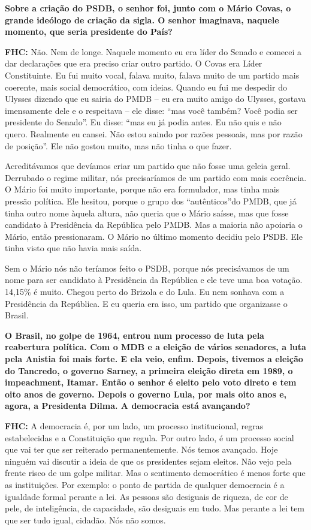 \textbf{Sobre a criação do PSDB, o senhor foi, junto com o Mário Covas,
o grande ideólogo de criação da sigla. O senhor imaginava, naquele
momento, que seria presidente do País?}

\textbf{FHC:} Não. Nem de longe. Naquele momento eu era líder do Senado
e comecei a dar declarações que era preciso criar outro partido. O Covas
era Líder Constituinte. Eu fui muito vocal, falava muito, falava muito
de um partido mais coerente, mais social democrático, com ideias. Quando
eu fui me despedir do Ulysses dizendo que eu sairia do PMDB -- eu era
muito amigo do Ulysses, gostava imensamente dele e o respeitava -- ele
disse: ``mas você também? Você podia ser presidente do Senado''. Eu
disse: ``mas eu já podia antes. Eu não quis e não quero. Realmente eu
cansei. Não estou saindo por razões pessoais, mas por razão de
posição''. Ele não gostou muito, mas não tinha o que fazer.

Acreditávamos que devíamos criar um partido que não fosse uma geleia
geral. Derrubado o regime militar, nós precisaríamos de um partido com
mais coerência. O Mário foi muito importante, porque não era formulador,
mas tinha mais pressão política. Ele hesitou, porque o grupo dos
``autênticos''do PMDB, que já tinha outro nome àquela altura, não queria
que o Mário saísse, mas que fosse candidato à Presidência da República
pelo PMDB. Mas a maioria não apoiaria o Mário, então pressionaram. O
Mário no último momento decidiu pelo PSDB. Ele tinha visto que não havia
mais saída.

Sem o Mário nós não teríamos feito o PSDB, porque nós precisávamos de um
nome para ser candidato à Presidência da República e ele teve uma boa
votação. 14,15\% é muito. Chegou perto do Brizola e do Lula. Eu nem
sonhava com a Presidência da República. E eu queria era isso, um partido
que organizasse o Brasil.

\textbf{O Brasil, no golpe de 1964, entrou num processo de luta pela
reabertura política. Com o MDB e a eleição de vários senadores, a luta
pela Anistia foi mais forte. E ela veio, enfim. Depois, tivemos a
eleição do Tancredo, o governo Sarney, a primeira eleição direta em
1989, o impeachment, Itamar. Então o senhor é eleito pelo voto direto e
tem oito anos de governo. Depois o governo Lula, por mais oito anos e,
agora, a Presidenta Dilma. A democracia está avançando?}

\textbf{FHC:} A democracia é, por um lado, um processo institucional,
regras estabelecidas e a Constituição que regula. Por outro lado, é um
processo social que vai ter que ser reiterado permanentemente. Nós temos
avançado. Hoje ninguém vai discutir a ideia de que os presidentes sejam
eleitos. Não vejo pela frente risco de um golpe militar. Mas o
sentimento democrático é menos forte que as instituições. Por exemplo: o
ponto de partida de qualquer democracia é a igualdade formal perante a
lei. As pessoas são desiguais de riqueza, de cor de pele, de
inteligência, de capacidade, são desiguais em tudo. Mas perante a lei
tem que ser tudo igual, cidadão. Nós não somos.


